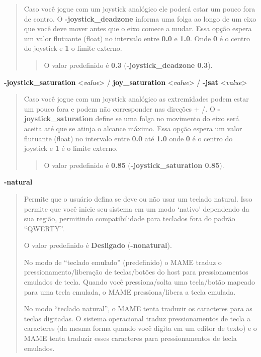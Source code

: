 \documentclass[letterpaper,10pt,brazil]{sphinxmanual}
\begin{document}
\begin{quote}

Caso você jogue com um joystick analógico ele poderá estar um pouco
fora de contro. O \textbf{-joystick\_deadzone} informa uma folga ao longo
de um eixo que você deve mover antes que o eixo comece a mudar.
Essa opção espera um valor flutuante (float) no intervalo entre
\textbf{0.0} e \textbf{1.0}. Onde \textbf{0} é o centro do joystick e \textbf{1} o
limite externo.
\begin{quote}

O valor predefinido é \textbf{0.3} (\textbf{-joystick\_deadzone 0.3}).
\end{quote}
\end{quote}
\label{commandline/commandline-all:mame-commandline-joysticksaturation}
\textbf{-joystick\_saturation} \textless{}\emph{value}\textgreater{} / \textbf{joy\_saturation} \textless{}\emph{value}\textgreater{} / \textbf{-jsat} \textless{}\emph{value}\textgreater{}
\begin{quote}

Caso você jogue com um joystick analógico as extremidades podem
estar um pouco fora e podem não corresponder nas direções + /.
O \textbf{-joystick\_saturation} define se uma folga no movimento do eixo
será aceita até que se atinja o alcance máximo. Essa opção espera um
valor flutuante (float) no intervalo entre \textbf{0.0} até \textbf{1.0} onde
\textbf{0} é o centro do joystick e \textbf{1} é o limite externo.
\begin{quote}

O valor predefinido é \textbf{0.85} (\textbf{-joystick\_saturation 0.85}).
\end{quote}
\end{quote}
\label{commandline/commandline-all:mame-commandline-natural}
\textbf{-natural}
\begin{quote}

Permite que o usuário defina se deve ou não usar um teclado natural.
Isso permite que você inicie seu sistema em um modo `nativo'
dependendo da sua região, permitindo compatibilidade para teclados
fora do padrão ``QWERTY''.

O valor predefinido é \textbf{Desligado} (\textbf{-nonatural}).

No modo de ``teclado emulado'' (predefinido) o MAME traduz o
pressionamento/liberação de teclas/botões do host para
pressionamentos emulados de tecla. Quando você pressiona/solta uma
tecla/botão mapeado para uma tecla emulada, o MAME pressiona/libera
a tecla emulada.

No modo ``teclado natural'', o MAME tenta traduzir os caracteres para
as teclas digitadas. O sistema operacional traduz pressionamentos
de tecla a caracteres (da mesma forma quando você digita em um
editor de texto) e o MAME tenta traduzir esses caracteres para
pressionamentos de tecla emulados.
\end{quote}
\end{document}

